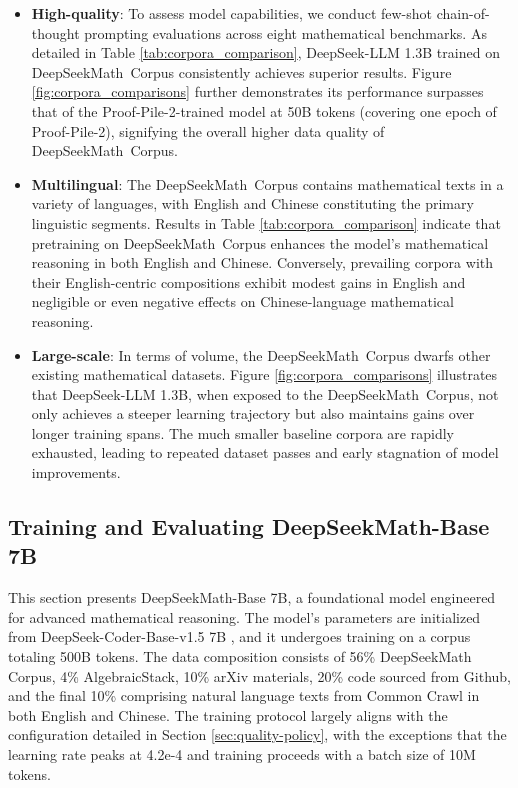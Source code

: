 \begin{itemize}[topsep=0pt]
\begin{itemize}[topsep=0pt]
    \item \textbf{High-quality}:
    To assess model capabilities, we conduct few-shot chain-of-thought prompting evaluations \cite{cot} across eight mathematical benchmarks. As detailed in Table \ref{tab:corpora_comparison}, DeepSeek-LLM 1.3B trained on DeepSeekMath~Corpus consistently achieves superior results. Figure \ref{fig:corpora_comparisons} further demonstrates its performance surpasses that of the Proof-Pile-2-trained model at 50B tokens (covering one epoch of Proof-Pile-2), signifying the overall higher data quality of DeepSeekMath~Corpus.
    \item \textbf{Multilingual}:
    The DeepSeekMath~Corpus contains mathematical texts in a variety of languages, with English and Chinese constituting the primary linguistic segments. Results in Table \ref{tab:corpora_comparison} indicate that pretraining on DeepSeekMath~Corpus enhances the model’s mathematical reasoning in both English and Chinese. Conversely, prevailing corpora with their English-centric compositions exhibit modest gains in English and negligible or even negative effects on Chinese-language mathematical reasoning.
    \item \textbf{Large-scale}:
    In terms of volume, the DeepSeekMath~Corpus dwarfs other existing mathematical datasets. Figure \ref{fig:corpora_comparisons} illustrates that DeepSeek-LLM 1.3B, when exposed to the DeepSeekMath~Corpus, not only achieves a steeper learning trajectory but also maintains gains over longer training spans. The much smaller baseline corpora are rapidly exhausted, leading to repeated dataset passes and early stagnation of model improvements.
\end{itemize}

\subsection{Training and Evaluating DeepSeekMath-Base 7B}

This section presents DeepSeekMath-Base 7B, a foundational model engineered for advanced mathematical reasoning. The model's parameters are initialized from DeepSeek-Coder-Base-v1.5 7B \citep{deepseek-coder}, and it undergoes training on a corpus totaling 500B tokens. The data composition consists of 56\% DeepSeekMath Corpus, 4\% AlgebraicStack, 10\% arXiv materials, 20\% code sourced from Github, and the final 10\% comprising natural language texts from Common Crawl in both English and Chinese. The training protocol largely aligns with the configuration detailed in Section \ref{sec:quality-policy}, with the exceptions that the learning rate peaks at 4.2e-4 and training proceeds with a batch size of 10M tokens.


\end{itemize}
